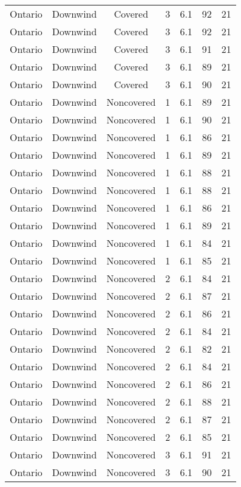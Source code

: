 \documentclass{article}
\begin{document}
\begin{longtable}[H]{ccccccc}
Ontario & Downwind & Covered     & 3 & 6.1  & 92  & 21 \\
Ontario & Downwind & Covered     & 3 & 6.1  & 92  & 21 \\
Ontario & Downwind & Covered     & 3 & 6.1  & 91  & 21 \\
Ontario & Downwind & Covered     & 3 & 6.1  & 89  & 21 \\
Ontario & Downwind & Covered     & 3 & 6.1  & 90  & 21 \\
Ontario & Downwind & Noncovered & 1 & 6.1  & 89  & 21 \\
Ontario & Downwind & Noncovered & 1 & 6.1  & 90  & 21 \\
Ontario & Downwind & Noncovered & 1 & 6.1  & 86  & 21 \\
Ontario & Downwind & Noncovered & 1 & 6.1  & 89  & 21 \\
Ontario & Downwind & Noncovered & 1 & 6.1  & 88  & 21 \\
Ontario & Downwind & Noncovered & 1 & 6.1  & 88  & 21 \\
Ontario & Downwind & Noncovered & 1 & 6.1  & 86  & 21 \\
Ontario & Downwind & Noncovered & 1 & 6.1  & 89  & 21 \\
Ontario & Downwind & Noncovered & 1 & 6.1  & 84  & 21 \\
Ontario & Downwind & Noncovered & 1 & 6.1  & 85  & 21 \\
Ontario & Downwind & Noncovered & 2 & 6.1  & 84  & 21 \\
Ontario & Downwind & Noncovered & 2 & 6.1  & 87  & 21 \\
Ontario & Downwind & Noncovered & 2 & 6.1  & 86  & 21 \\
Ontario & Downwind & Noncovered & 2 & 6.1  & 84  & 21 \\
Ontario & Downwind & Noncovered & 2 & 6.1  & 82  & 21 \\
Ontario & Downwind & Noncovered & 2 & 6.1  & 84  & 21 \\
Ontario & Downwind & Noncovered & 2 & 6.1  & 86  & 21 \\
Ontario & Downwind & Noncovered & 2 & 6.1  & 88  & 21 \\
Ontario & Downwind & Noncovered & 2 & 6.1  & 87  & 21 \\
Ontario & Downwind & Noncovered & 2 & 6.1  & 85  & 21 \\
Ontario & Downwind & Noncovered & 3 & 6.1  & 91  & 21 \\
Ontario & Downwind & Noncovered & 3 & 6.1  & 90  & 21 \\

\end{longtable}
\end{document}
